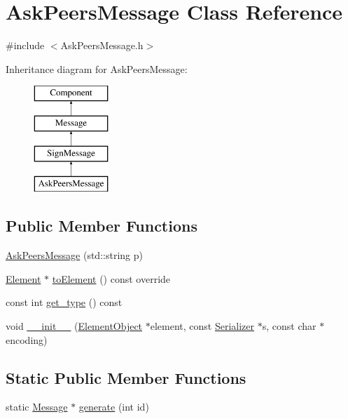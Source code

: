 \hypertarget{classAskPeersMessage}{}\section{Ask\+Peers\+Message Class Reference}
\label{classAskPeersMessage}


{\ttfamily \#include $<$Ask\+Peers\+Message.\+h$>$}

Inheritance diagram for Ask\+Peers\+Message\+:\begin{figure}[H]
\begin{center}
\leavevmode
\includegraphics[height=4.000000cm]{classAskPeersMessage}
\end{center}
\end{figure}
\subsection*{Public Member Functions}
\begin{DoxyCompactItemize}
\item 
\mbox{\hyperlink{classAskPeersMessage_a55a68df97385093ce959c101b2331bf5}{Ask\+Peers\+Message}} (std\+::string p)
\item 
\mbox{\hyperlink{classElement}{Element}} $\ast$ \mbox{\hyperlink{classSignMessage_aee897c4bf78df966b8cca95e589566e4}{to\+Element}} () const override
\item 
const int \mbox{\hyperlink{classMessage_a2a576dcffd45c4574fcdf2897ec26086}{get\+\_\+type}} () const
\item 
void \mbox{\hyperlink{classComponent_a28212595f8ee85fe009bd233bc99b2fc}{\+\_\+\+\_\+init\+\_\+\+\_\+}} (\mbox{\hyperlink{classElementObject}{Element\+Object}} $\ast$element, const \mbox{\hyperlink{classSerializer}{Serializer}} $\ast$s, const char $\ast$encoding)
\end{DoxyCompactItemize}
\subsection*{Static Public Member Functions}
\begin{DoxyCompactItemize}
\item 
static \mbox{\hyperlink{classMessage}{Message}} $\ast$ \mbox{\hyperlink{classMessage_ad92a0e1cfa5b5a503ec9c61833e3e5ea}{generate}} (int id)
\end{DoxyCompactItemize}
